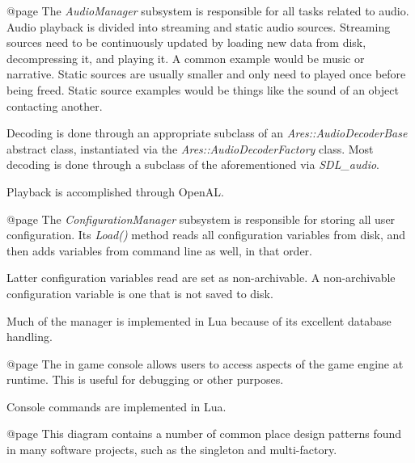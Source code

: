     {}

@page
The {\it AudioManager} subsystem is responsible for all tasks related to audio. Audio playback is divided into streaming and static audio sources. Streaming sources need to be continuously updated by loading new data from disk, decompressing it, and playing it. A common example would be music or narrative. Static sources are usually smaller and only need to played once before being freed. Static source examples would be things like the sound of an object contacting another.

Decoding is done through an appropriate subclass of an {\it Ares::AudioDecoderBase} abstract class, instantiated via the {\it Ares::AudioDecoderFactory} class. Most decoding is done through a subclass of the aforementioned via {\it SDL_audio}.

Playback is accomplished through OpenAL.

    {}


@page
The {\it ConfigurationManager} subsystem is responsible for storing all user configuration. Its {\it Load()} method reads all configuration variables from disk, and then adds variables from command line as well, in that order. 

Latter configuration variables read are set as non-archivable. A non-archivable configuration variable is one that is not saved to disk.

Much of the manager is implemented in Lua because of its excellent database handling.

    {}

@page
The in game console allows users to access aspects of the game engine at runtime. This is useful for debugging or other purposes.

Console commands are implemented in Lua.

    {}

@page
This diagram contains a number of common place design patterns found in many software projects, such as the singleton and multi-factory. 

